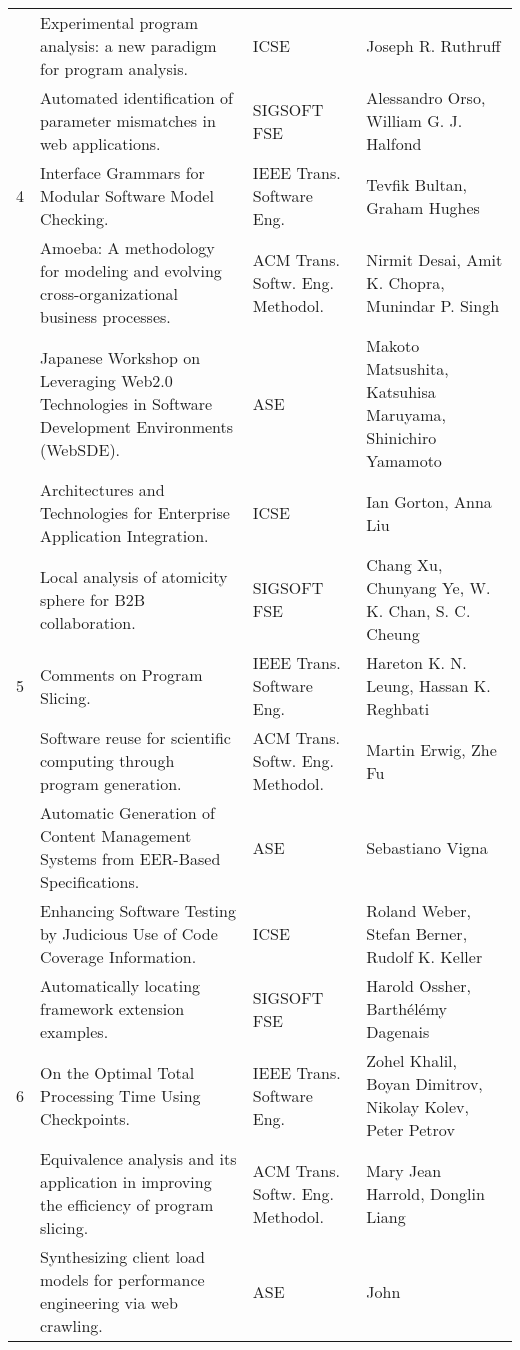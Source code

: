 \begin{table}[h]
{\begin{tabular}{|llll|}
	& Experimental program analysis: a new paradigm for program analysis.& ICSE& Joseph R. 
Ruthruff \\
\rowcolor{black!20}	& Automated identification of parameter mismatches in web applications.& 
SIGSOFT FSE& Alessandro Orso, William G. J. Halfond \\
    4	& Interface Grammars for Modular Software Model Checking.& IEEE Trans. Software Eng.& 
Tevfik 
Bultan, Graham Hughes \\
\rowcolor{black!20}	& Amoeba: A methodology for modeling and evolving cross-organizational 
business processes.& ACM Trans. Softw. Eng. Methodol.& Nirmit Desai, Amit K. Chopra, Munindar P. 
Singh \\
	& Japanese Workshop on Leveraging Web2.0 Technologies in Software Development Environments 
(WebSDE).& ASE& Makoto Matsushita, Katsuhisa Maruyama, Shinichiro Yamamoto \\
\rowcolor{black!20}	& Architectures and Technologies for Enterprise Application Integration.& 
ICSE& Ian Gorton, Anna Liu \\
	& Local analysis of atomicity sphere for B2B collaboration.& SIGSOFT FSE& Chang Xu, 
Chunyang Ye, W. K. Chan, S. C. Cheung \\
\rowcolor{black!20}    5	& Comments on Program Slicing.& IEEE Trans. Software Eng.& Hareton 
K. N. Leung, Hassan K. Reghbati \\
	& Software reuse for scientific computing through program generation.& ACM Trans. Softw. 
Eng. Methodol.& Martin Erwig, Zhe Fu \\
\rowcolor{black!20}	& Automatic Generation of Content Management Systems from EER-Based 
Specifications.& ASE& Sebastiano Vigna \\
	& Enhancing Software Testing by Judicious Use of Code Coverage Information.& ICSE& Roland 
Weber, Stefan Berner, Rudolf K. Keller \\
\rowcolor{black!20}	& Automatically locating framework extension examples.& SIGSOFT FSE& Harold 
Ossher, Barthélémy Dagenais \\
    6	& On the Optimal Total Processing Time Using Checkpoints.& IEEE Trans. Software Eng.& Zohel 
Khalil, Boyan Dimitrov, Nikolay Kolev, Peter Petrov \\
\rowcolor{black!20}	& Equivalence analysis and its application in improving the efficiency of 
program slicing.& ACM Trans. Softw. Eng. Methodol.& Mary Jean Harrold, Donglin Liang \\
	& Synthesizing client load models for performance engineering via web crawling.& ASE& John 

\end{tabular}}
\end{table}
